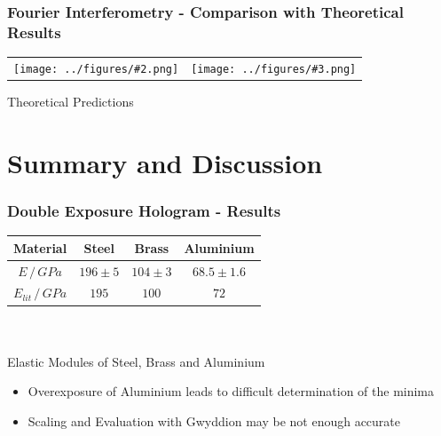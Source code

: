 \documentclass{beamer}
\newcommand{\graTwoOne}[4][]{
	\begin{table}
		\centering
	\begin{tabular}[width=\textwidth]{cc}
		\texttt{[image: ../figures/\#2.png]}&
		\texttt{[image: ../figures/\#3.png]}
	\end{tabular}
	{#4}
	\end{table}
}
\begin{document}
\begin{frame}
	\frametitle{Fourier Interferometry - Comparison with Theoretical Results}
\graTwoOne[0.4]{Korrelation_Spalt1}{Korrelation_Spalt2}{Theoretical Predictions}
\end{frame}

\section{Summary and Discussion}
\frame{\tableofcontents[currentsection]}
\begin{frame}
	\frametitle{Double Exposure Hologram - Results}
	\begin{table}
		\begin{tabular}{c|ccc}
			Material&Steel&Brass&Aluminium\\\hline
			$E\,/\,\si{GPa}$&$196\pm5$&$104\pm3$&$68.5\pm1.6$\\
			$E_{lit}\,/\,\si{GPa}$\footfullcite{staats}&$195$&$100$&$72$
		\end{tabular}\\\scriptsize\ \\
		{\small Elastic Modules of Steel, Brass and Aluminium}
	\end{table}
	\pause
	\begin{itemize}
		\item Overexposure of Aluminium leads to difficult determination of the minima
		\pause
		\item Scaling and Evaluation with Gwyddion may be not enough accurate
	\end{itemize}
\end{frame}
\end{document}
